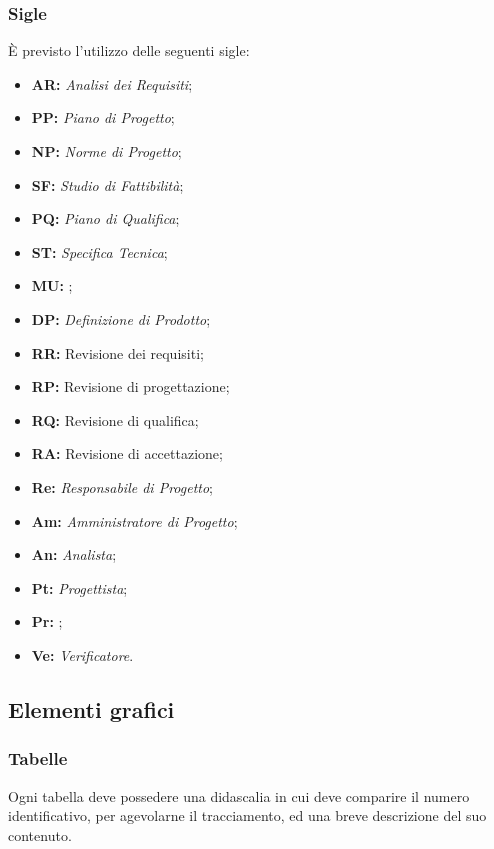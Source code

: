 \documentclass[../NormediProgetto.tex]{subfiles}
\begin{document}
\subsubsection{Sigle}

È previsto l’utilizzo delle seguenti sigle: 

\begin{itemize}
\item{\textbf{AR:}} \textit{Analisi dei Requisiti};
\item{\textbf{PP:}} \textit{Piano di Progetto};
\item{\textbf{NP:}} \textit{Norme di Progetto};
\item{\textbf{SF:}} \textit{Studio di Fattibilità};
\item{\textbf{PQ:}} \textit{Piano di Qualifica};
\item{\textbf{ST:}} \textit{Specifica Tecnica};
\item{\textbf{MU:}} ;
\item{\textbf{DP:}} \textit{Definizione di Prodotto};
\item{\textbf{RR:}} Revisione dei requisiti;
\item{\textbf{RP:}} Revisione di progettazione;
\item{\textbf{RQ:}} Revisione di qualifica;
\item{\textbf{RA:}} Revisione di accettazione;
\item{\textbf{Re:}} \textit{Responsabile di Progetto};
\item{\textbf{Am:}} \textit{Amministratore di Progetto};
\item{\textbf{An:}} \textit{Analista};
\item{\textbf{Pt:}} \textit{Progettista};
\item{\textbf{Pr:}} ;
\item{\textbf{Ve:}} \textit{Verificatore}.
\end{itemize}

\subsection{Elementi grafici}

\subsubsection{Tabelle}

Ogni tabella deve possedere una didascalia in cui deve comparire il numero identificativo, per agevolarne il tracciamento, ed una breve descrizione del suo contenuto.
\end{document}
